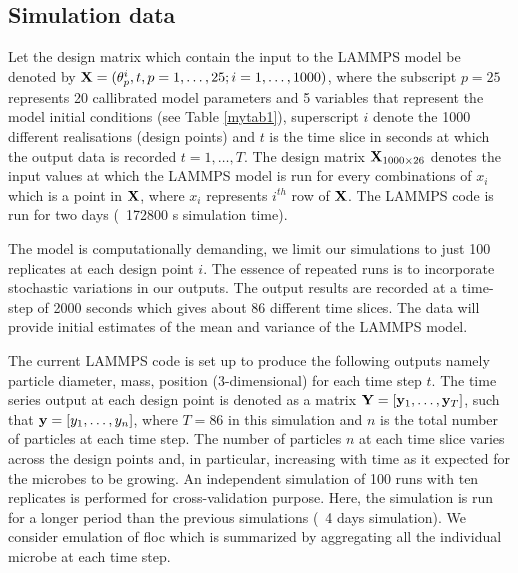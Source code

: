 \subsection{Simulation data}\label{data2}
Let the design matrix which contain the input to the LAMMPS model be denoted by ${\bf X}=(\theta^i_p, t, p=1,\ldots,25; i=1,\ldots,1000)$, where the subscript $p=25$ represents 20 callibrated model parameters and 5 variables that represent the model initial conditions (see Table \ref{mytab1}), superscript $i$ denote the 1000 different realisations (design points) and $t$ is the time slice in seconds at which the output data is recorded $t=1,\ldots,T$. The design matrix ${\bf X}_{1000 \times 26}$ denotes the input values at which the LAMMPS model is run for every combinations of $x_i$ which is a point in ${\bf X}$, where $x_i$ represents $i^{th}$ row of ${\bf X}$.  The LAMMPS code is run for two days (~172800 s simulation time). 

The model is computationally demanding, we limit our simulations to just 100 replicates at each design point $i$. The essence of repeated runs is to incorporate stochastic variations in our outputs. The output results are recorded at a time-step of 2000 seconds which gives about 86 different time slices. The data will provide initial estimates of the mean and variance of the LAMMPS model.

The current LAMMPS code is set up to produce the following outputs namely particle diameter, mass, position (3-dimensional) for each time step $t$. The time series output at each design point is denoted as a matrix ${\bf Y}=[{\bf y}_1,\ldots,{\bf y}_T]$, such that ${\bf y}=[y_1,\ldots,y_n]$,  where $T=86$ in this simulation and $n$ is the total number of particles at each time step. The number of particles $n$ at each time slice varies across the design points and, in particular, increasing with time as it expected for the microbes to be growing. An independent simulation of 100 runs with ten replicates is performed for cross-validation purpose. Here, the simulation is run for a longer period than the previous simulations (~4 days simulation). 
We consider emulation of floc which is summarized by aggregating all the individual microbe at each time step. 



